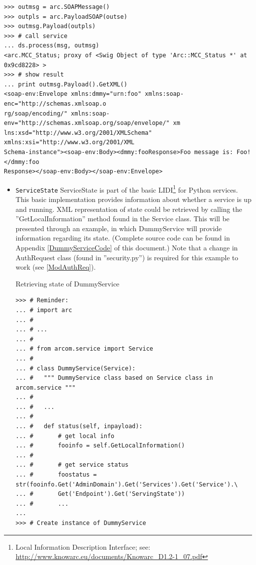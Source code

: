 \documentclass{article}
\begin{document}
\begin{flushleft}
\begin{itemize}
{\begin{example}
\begin{verbatim}
>>> outmsg = arc.SOAPMessage()
>>> outpls = arc.PayloadSOAP(outse)
>>> outmsg.Payload(outpls)
>>> # call service
... ds.process(msg, outmsg)
<arc.MCC_Status; proxy of <Swig Object of type 'Arc::MCC_Status *' at 0x9cd8228> >
>>> # show result
... print outmsg.Payload().GetXML()
<soap-env:Envelope xmlns:dmmy="urn:foo" xmlns:soap-enc="http://schemas.xmlsoap.o
rg/soap/encoding/" xmlns:soap-env="http://schemas.xmlsoap.org/soap/envelope/" xm
lns:xsd="http://www.w3.org/2001/XMLSchema" xmlns:xsi="http://www.w3.org/2001/XML
Schema-instance"><soap-env:Body><dmmy:fooResponse>Foo message is: Foo!</dmmy:foo
Response></soap-env:Body></soap-env:Envelope>
\end{verbatim}
    \end{example}
  }
\end{itemize}

\begin{itemize}
  \item{ \verb$ServiceState$ \linebreak
  ServiceState is part of the basic LIDI\footnote{Local Information Description Interface; see: 
  \url{http://www.knowarc.eu/documents/Knowarc_D1.2-1_07.pdf}} for Python services. This basic 
  implementation provides information about whether a service is up and running. XML 
  representation of state could be retrieved by calling the ''GetLocalInformation'' method 
  found in the Service class. This will be presented through an example, in which DummyService 
  will provide information regarding its state. (Complete source code can be found in Appendix 
  \ref{DummyServiceCode} of this document.)\linebreak
  Note that a change in AuthRequest class (found in ''security.py'') is required for 
  this example to work (see \ref{ModAuthReq}).
    \begin{example}
      \caption{Retrieving state of DummyService}\label{RetDSstate}
\begin{verbatim}
>>> # Reminder:
... # import arc
... #
... # ...
... # 
... # from arcom.service import Service
... # 
... # class DummyService(Service):
... #   """ DummyService class based on Service class in arcom.service """
... # 
... #   ...
... # 
... #   def status(self, inpayload):
... #       # get local info
... #       fooinfo = self.GetLocalInformation()
... #       
... #       # get service status
... #       foostatus = str(fooinfo.Get('AdminDomain').Get('Services').Get('Service').\
... #       Get('Endpoint').Get('ServingState'))
... #       ...
... 
>>> # Create instance of DummyService

\end{verbatim}
\end{example}}
\end{itemize}
\end{flushleft}
\end{document}
